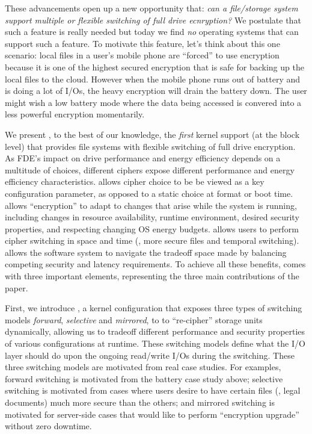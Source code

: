 These advancements open up a new opportunity that: {\em can a file/storage
  system support multiple or flexible switching of full drive ecnryption?}
We postulate that such a feature is really needed but today we find {\em
  no} operating systems that can support such a feature.  To motivate this
feature, let's think about this one scenario: local files in a user's
mobile phone are ``forced'' to use encryption \encA because it is one of
the highest secured encryption that is safe for backing up the local files
to the cloud.  However when the mobile phone runs out of battery and is
doing a lot of I/Os, the heavy encryption will drain the battery down.
The user might wish a low battery mode where the data being accessed is
convered into a less powerful encryption momentarily.




We present \sys, to the best of our knowledge, the {\em first} kernel
support (at the block level) that provides file systems with flexible
switching of full drive encryption.  As FDE's impact on drive performance
and energy efficiency depends on a multitude of choices, different ciphers
expose different performance and energy efficiency characteristics.  \sys
allows cipher choice to be be viewed as a key configuration parameter, as
opposed to a static choice at format or boot time.  \sys allows
``encryption'' to adapt to changes that arise while the system is running,
including changes in resource availability, runtime environment, desired
security properties, and respecting changing OS energy budgets.  \sys
allows users to perform cipher switching in space and time (\eg, more
secure files and temporal switching).  \sys allows the software system to
navigate the tradeoff space made by balancing competing security and
latency requirements.   To achieve all these benefits, \sys comes with
three important elements, representing the three main contributions of the
paper.


First, we introduce \sysA, a kernel configuration that exposes three types of
switching models {\em forward}, {\em selective} and {\em mirrored}, to to
``re-cipher'' storage units dynamically, allowing us to tradeoff different
performance and security properties of various configurations at runtime.
These switching models define what the I/O layer should do upon the
ongoing read/write I/Os during the switching.  These three switching
models are motivated from real case studies.  For examples, forward
switching is motivated from the battery case study above; selective
switching is motivated from cases where users desire to have certain files
(\eg, legal documents) much more secure than the others; and mirrored
switching is motivated for server-side cases that would like to perform
``encryption upgrade'' without zero downtime.

